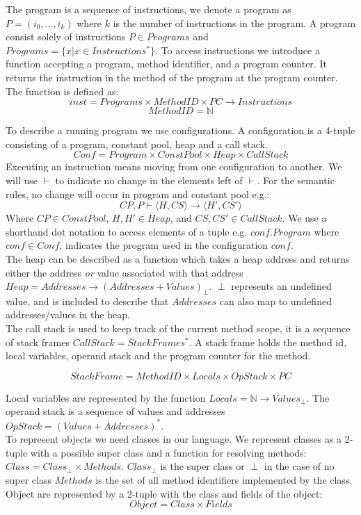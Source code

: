 The program is a sequence of instructions, we denote a program as $P = (i_0, \ldots, i_k)$ where $k$ is the number of instructions in the program. 
A program consist solely of instructions $P \in Programs$ and $Programs =  \{ x | x \in Instructions^{*} \}$.
To access instructions we introduce a function accepting a program, method identifier, and a program counter. 
It returns the instruction in the method of the program at the program counter.
The function is defined as:
$$inst = Programs \times MethodID \times PC \to   Instructions$$
$$MethodID = \mathbb{N}$$

To describe a running program we use configurations.
A configuration is a 4-tuple consisting of a program, constant pool, heap and a call stack. 
$$Conf = Program \times ConstPool \times Heap \times CallStack$$
Executing an instruction means moving from one configuration to another. 
We will use $\vdash$ to indicate no change in the elements left of $\vdash$. 
For the semantic rules, no change will occur in program and constant pool e.g.:
$$CP, P \vdash \langle H, CS \rangle \rightarrow \langle H', CS' \rangle$$
Where $CP \in ConstPool$, $H,H' \in Heap$, and $CS, CS' \in CallStack$.
We use a shorthand dot notation to access elements of a tuple e.g. $conf.Program$ where $conf \in Conf$, indicates the program used in the configuration $conf$.\\

The heap can be described as a function which takes a heap address and returns either the address \textit{or} value associated with that address $Heap = Addresses \to   (Addresses + Values)_\perp$. $\perp$ represents an undefined value, and is included to describe that $Addresses$ can also map to undefined addresses/values in the heap.\\

The call stack is used to keep track of the current method scope, it is a sequence of stack frames $CallStack = StackFrames^{*}$.
A stack frame holds the method id, local variables, operand stack and the program counter for the method.

$$StackFrame = MethodID \times Locals \times OpStack \times PC $$

Local variables are represented by the function $Locals = \mathbb{N} \to   Values_\perp$. 
The operand stack is a sequence of values and addresses $OpStack = (Values + Addresses)^{*}$. \\

To represent objects we need classes in our language.
We represent classes as a 2-tuple with a possible super class and a function for resolving methods: $Class = Class_\perp \times Methods$.
$Class_\perp$ is the super class or $\perp$ in the case of no super class  
$Methods$ is the set of all method identifiers implemented by the class.
Object are represented by a 2-tuple with the class and fields of the object: 
$$Object = Class \times Fields$$ 

